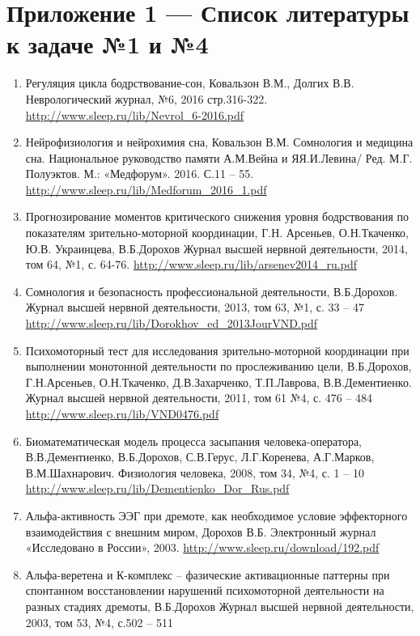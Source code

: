 \section*{Приложение 1 — Список литературы к задаче №1 и №4}

\begin{enumerate}
    \item Регуляция цикла бодрствование-сон, Ковальзон В.М., Долгих В.В. Неврологический журнал, №6, 2016 стр.316-322. 
    \url{http://www.sleep.ru/lib/Nevrol_6-2016.pdf}
    \item Нейрофизиология и нейрохимия сна, Ковальзон В.М. Сомнология и медицина сна. Национальное руководство памяти А.М.Вейна и ЯЯ.И.Левина/ Ред. М.Г. Полуэктов. М.: «Медфорум». 2016. С.11 – 55. 
    \url{http://www.sleep.ru/lib/Medforum_2016_1.pdf}
    \item Прогнозирование моментов критического снижения уровня бодрствования по показателям зрительно-моторной координации, Г.Н. Арсеньев, О.Н.Ткаченко, Ю.В. Украинцева, В.Б.Дорохов
    Журнал высшей нервной деятельности, 2014, том 64, №1, с. 64-76. 
    \url{http://www.sleep.ru/lib/arsenev2014_ru.pdf}
    \item Сомнология и безопасность профессиональной деятельности, В.Б.Дорохов. 
    Журнал высшей нервной деятельности, 2013, том 63, №1, с. 33 – 47
    \url{http://www.sleep.ru/lib/Dorokhov_ed_2013JourVND.pdf}
    \item Психомоторный тест для исследования зрительно-моторной координации при выполнении монотонной деятельности по прослеживанию цели, В.Б.Дорохов, Г.Н.Арсеньев, О.Н.Ткаченко, Д.В.Захарченко, Т.П.Лаврова, В.В.Дементиенко. 
    Журнал высшей нервной деятельности, 2011, том 61 №4, с. 476 – 484
    \url{http://www.sleep.ru/lib/VND0476.pdf}
    \item Биоматематическая модель процесса засыпания человека-оператора, В.В.Дементиенко, В.Б.Дорохов, С.В.Герус, Л.Г.Коренева, А.Г.Марков, В.М.Шахнарович. Физиология человека, 2008, том 34, №4, с. 1 – 10
    \url{http://www.sleep.ru/lib/Dementienko_Dor_Rus.pdf}
    \item Альфа-активность ЭЭГ при дремоте, как необходимое условие эффекторного взаимодействия с внешним миром, Дорохов В.Б. Электронный журнал «Исследовано в России», 2003.
    \url{http://www.sleep.ru/download/192.pdf}
    \item Альфа-веретена и К-комплекс – фазические активационные паттерны при спонтанном восстановлении нарушений психомоторной деятельности на разных стадиях дремоты, В.Б.Дорохов
    Журнал высшей нервной деятельности, 2003, том 53, №4, с.502 – 511

\end{enumerate}

